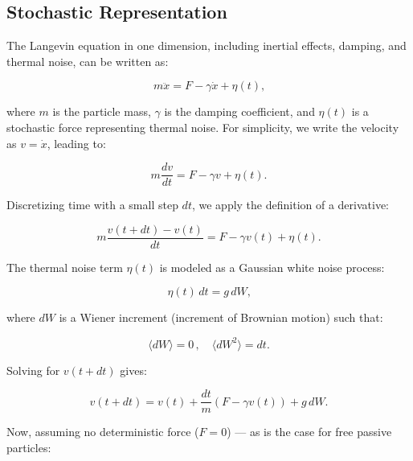 \subsection{Stochastic Representation}
\label{stochasticrepresentation}

The Langevin equation \cite{uhlenbeck1930theory} in one dimension, including inertial effects, damping, and thermal noise, can be written as:

\begin{equation}
  m\ddot{x} = F - \gamma \dot{x} + \eta(t)\text{,}
  \label{eq:newton}
\end{equation}

where $m$ is the particle mass, $\gamma$ is the damping coefficient, and $\eta(t)$ is a stochastic force representing thermal noise. For simplicity, we write the velocity as $v = \dot{x}$, leading to:

\begin{equation}
  m\frac{dv}{dt} = F - \gamma v + \eta(t)\text{.}
  \label{eq:newtonv}
\end{equation}

Discretizing time with a small step $dt$, we apply the definition of a derivative:

\begin{equation}
  m \frac{v(t + dt) - v(t)}{dt} = F - \gamma v(t) + \eta(t)\text{.}
  \label{eq:newtonderivative}
\end{equation}

The thermal noise term $\eta(t)$ is modeled as a Gaussian white noise process:

\begin{equation}
  \eta(t)\, dt = g\, dW\text{,}
  \label{eq:eta}
\end{equation}

where $dW$ is a Wiener increment (increment of Brownian motion) such that:

\begin{equation}
  \langle dW \rangle = 0\,, \quad \langle dW^2 \rangle = dt\text{.}
  \label{eq:meanvariance}
\end{equation}

Solving for $v(t + dt)$ gives:

\begin{equation}
  v(t + dt) = v(t) + \frac{dt}{m}(F - \gamma v(t)) + g\, dW\text{.}
  \label{eq:velocityplusone}
\end{equation}

Now, assuming no deterministic force ($F = 0$) — as is the case for free passive particles:

